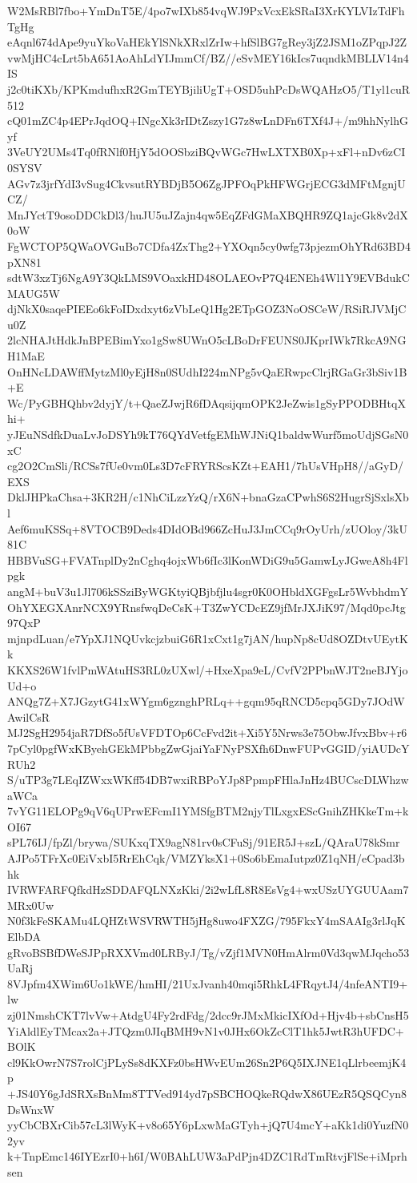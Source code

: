 W2MsRBl7fbo+YmDnT5E/4po7wIXb854vqWJ9PxVcxEkSRaI3XrKYLVIzTdFhTgHg
eAqnl674dApe9yuYkoVaHEkYlSNkXRxlZrIw+hfSlBG7gRey3jZ2JSM1oZPqpJ2Z
vwMjHC4cLrt5bA651AoAhLdYIJmmCf/BZ//eSvMEY16kIcs7uqndkMBLLV14n4IS
j2c0tiKXb/KPKmdufhxR2GmTEYBjiliUgT+OSD5uhPcDsWQAHzO5/T1yl1cuR512
cQ01mZC4p4EPrJqdOQ+INgcXk3rIDtZszy1G7z8wLnDFn6TXf4J+/m9hhNylhGyf
3VeUY2UMs4Tq0fRNlf0HjY5dOOSbziBQvWGc7HwLXTXB0Xp+xFl+nDv6zCI0SYSV
AGv7z3jrfYdI3vSug4CkvsutRYBDjB5O6ZgJPFOqPkHFWGrjECG3dMFtMgnjUCZ/
MnJYctT9osoDDCkDl3/huJU5uJZajn4qw5EqZFdGMaXBQHR9ZQ1ajcGk8v2dX0oW
FgWCTOP5QWaOVGuBo7CDfa4ZxThg2+YXOqn5cy0wfg73pjezmOhYRd63BD4pXN81
sdtW3xzTj6NgA9Y3QkLMS9VOaxkHD48OLAEOvP7Q4ENEh4Wl1Y9EVBdukCMAUG5W
djNkX0saqePIEEo6kFoIDxdxyt6zVbLeQ1Hg2ETpGOZ3NoOSCeW/RSiRJVMjCu0Z
2lcNHAJtHdkJnBPEBimYxo1gSw8UWnO5cLBoDrFEUNS0JKprIWk7RkcA9NGH1MaE
OnHNcLDAWffMytzMl0yEjH8n0SUdhI224mNPg5vQaERwpcClrjRGaGr3bSiv1B+E
Wc/PyGBHQhbv2dyjY/t+QaeZJwjR6fDAqsijqmOPK2JeZwis1gSyPPODBHtqXhi+
yJEuNSdfkDuaLvJoDSYh9kT76QYdVetfgEMhWJNiQ1baldwWurf5moUdjSGsN0xC
cg2O2CmSli/RCSs7fUe0vm0Ls3D7cFRYRScsKZt+EAH1/7hUsVHpH8//aGyD/EXS
DklJHPkaChsa+3KR2H/c1NhCiLzzYzQ/rX6N+bnaGzaCPwhS6S2HugrSjSxlsXbl
Aef6muKSSq+8VTOCB9Deds4DIdOBd966ZcHuJ3JmCCq9rOyUrh/zUOloy/3kU81C
HBBVuSG+FVATnplDy2nCghq4ojxWb6fIc3lKonWDiG9u5GamwLyJGweA8h4Flpgk
angM+buV3u1Jl706kSSziByWGKtyiQBjbfjlu4sgr0K0OHbldXGFgsLr5WvbhdmY
OhYXEGXAnrNCX9YRnsfwqDeCsK+T3ZwYCDcEZ9jfMrJXJiK97/Mqd0pcJtg97QxP
mjnpdLuan/e7YpXJ1NQUvkcjzbuiG6R1xCxt1g7jAN/hupNp8cUd8OZDtvUEytKk
KKXS26W1fvlPmWAtuHS3RL0zUXwl/+HxeXpa9eL/CvfV2PPbnWJT2neBJYjoUd+o
ANQg7Z+X7JGzytG41xWYgm6gznghPRLq++gqm95qRNCD5cpq5GDy7JOdWAwilCsR
MJ2SgH2954jaR7DfSo5fUsVFDTOp6CcFvd2it+Xi5Y5Nrws3e75ObwJfvxBbv+r6
7pCyl0pgfWxKByehGEkMPbbgZwGjaiYaFNyPSXfh6DnwFUPvGGID/yiAUDcYRUh2
S/uTP3g7LEqIZWxxWKff54DB7wxiRBPoYJp8PpmpFHlaJnHz4BUCscDLWhzwaWCa
7vYG11ELOPg9qV6qUPrwEFcmI1YMSfgBTM2njyTlLxgxEScGnihZHKkeTm+kOI67
sPL76IJ/fpZl/brywa/SUKxqTX9agN81rv0sCFuSj/91ER5J+szL/QAraU78kSmr
AJPo5TFrXc0EiVxbI5RrEhCqk/VMZYksX1+0So6bEmaIutpz0Z1qNH/eCpad3bhk
IVRWFARFQfkdHzSDDAFQLNXzKki/2i2wLfL8R8EsVg4+wxUSzUYGUUAam7MRx0Uw
N0f3kFeSKAMu4LQHZtWSVRWTH5jHg8uwo4FXZG/795FkxY4mSAAIg3rlJqKElbDA
gRvoBSBfDWeSJPpRXXVmd0LRByJ/Tg/vZjf1MVN0HmAlrm0Vd3qwMJqcho53UaRj
8VJpfm4XWim6Uo1kWE/hmHI/21UxJvanh40mqi5RhkL4FRqytJ4/4nfeANTI9+lw
zj01NmshCKT7lvVw+AtdgU4Fy2rdFdg/2dcc9rJMxMkicIXfOd+Hjv4b+sbCnsH5
YiAldlEyTMcax2a+JTQzm0JIqBMH9vN1v0JHx6OkZcClT1hk5JwtR3hUFDC+BOlK
cl9KkOwrN7S7rolCjPLySs8dKXFz0bsHWvEUm26Sn2P6Q5IXJNE1qLlrbeemjK4p
+JS40Y6gJdSRXsBnMm8TTVed914yd7pSBCHOQkeRQdwX86UEzR5QSQCyn8DsWnxW
yyCbCBXrCib57cL3lWyK+v8o65Y6pLxwMaGTyh+jQ7U4mcY+aKk1di0YuzfN02yv
k+TnpEmc146IYEzrI0+h6I/W0BAhLUW3aPdPjn4DZC1RdTmRtvjFlSe+iMprhsen
